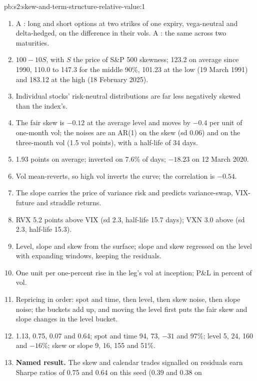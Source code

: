 \begin{solution}{pb:s2:skew-and-term-structure-relative-value:1}
\begin{enumerate}
\item A : long and short options at two strikes of one expiry, vega-neutral and delta-hedged, on the difference in their vols. A
: the same across two maturities.
\item $100 - 10S$, with $S$ the price of S\&P 500 skewness; 123.2 on average since 1990, 110.0 to 147.3 for the middle 90\%, 101.23 at the low
(19 March 1991) and 183.12 at the high (18 February 2025).
\item Individual stocks' risk-neutral distributions are far less negatively skewed than the index's.
\item The fair skew is $-0.12$ at the average level and moves by $-0.4$ per unit of one-month vol; the noises are an AR(1) on the skew (sd 0.06) and on
the three-month vol (1.5 vol points), with a half-life of 34 days.
\item 1.93 points on average; inverted on 7.6\% of days; $-18.23$ on 12 March 2020.
\item Vol mean-reverts, so high vol inverts the curve; the correlation is $-0.54$.
\item The slope carries the price of variance risk and predicts variance-swap, VIX-future and straddle returns.
\item RVX 5.2 points above VIX (sd 2.3, half-life 15.7 days); VXN 3.0 above (sd 2.3, half-life 15.3).
\item Level, slope and skew from the surface; slope and skew regressed on the level with expanding windows, keeping the residuals.
\item One unit per one-percent rise in the leg's vol at inception; P\&L in percent of vol.
\item Repricing in order: spot and time, then level, then skew noise, then slope noise; the buckets add up, and moving the level first puts the fair
skew and slope changes in the level bucket.
\item 1.13, 0.75, 0.07 and 0.64; spot and time 94, 73, $-31$ and 97\%; level 5, 24, 160 and $-16$\%; skew or slope 9, 16, 155 and 51\%.
\item \textbf{Named result.} The skew and calendar trades signalled on residuals earn Sharpe ratios of 0.75 and 0.64 on this seed (0.39 and 0.38 on

\end{enumerate}
\end{solution}

